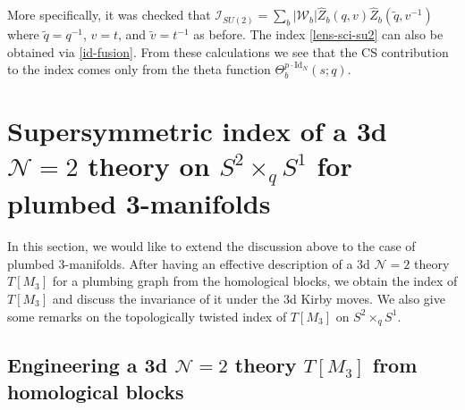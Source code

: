 \documentclass[11pt,hyper,a4paper]{article}
\begin{document}
More specifically, it was checked that $\mathcal{I}_{SU(2)} = \sum_{b} |\mathcal{W}_b| \widehat{Z}_b(q,v) \widehat{Z}_b(\tilde{q},v^{-1})$ where $\tilde{q}=q^{-1}$, $v=t$, and $\tilde{v}=t^{-1}$ as before.
The index \eqref{lens-sci-su2} can also be obtained via \eqref{id-fusion}.
From these calculations we see that the CS contribution to the index comes only from the theta function $\Theta_b^{p \cdot \text{Id}_N}(s;q)$.


























\section{Supersymmetric index of a 3d $\mathcal{N}=2$ theory on $S^2 \times_q S^1$ for plumbed 3-manifolds}

In this section, we would like to extend the discussion above to the case of plumbed 3-manifolds.
After having an effective description of a 3d $\mathcal{N}=2$ theory $T[M_3]$ for a plumbing graph from the homological blocks, we obtain the index of $T[M_3]$ and discuss the invariance of it under the 3d Kirby moves.
We also give some remarks on the topologically twisted index of $T[M_3]$ on $S^2 \times_q S^1$.




\subsection{Engineering a 3d $\mathcal{N}=2$ theory $T[M_3]$ from homological blocks}
\end{document}
